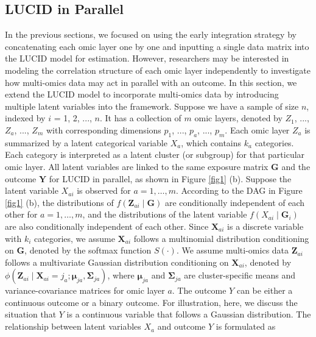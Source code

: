 \subsection{LUCID in Parallel} \label{sec_parallel}
In the previous sections, we focused on using the early integration strategy by concatenating each omic layer one by one and inputting a single data matrix into the LUCID model for estimation. However, researchers may be interested in modeling the correlation structure of each omic layer independently to investigate how multi-omics data may act in parallel with an outcome. In this section, we extend the LUCID model to incorporate multi-omics data by introducing multiple latent variables into the framework. Suppose we have a sample of size $n$, indexed by $i$ = 1, 2, ..., $n$. It has a collection of $m$ omic layers, denoted by $Z_1$, ..., $Z_a$, ..., $Z_m$ with corresponding dimensions $p_1$, ..., $p_a$, ..., $p_m$. Each omic layer $Z_a$ is summarized by a latent categorical variable $X_a$, which contains $k_a$ categories. Each category is interpreted as a latent cluster (or subgroup) for that particular omic layer. All latent variables are linked to the same exposure matrix $\bm G$ and the outcome $\bm Y$ for LUCID in parallel, as shown in Figure \ref{fig1} (b).
Suppose the latent variable $X_{a i}$ is observed for $a=1, \ldots, m$. According to the DAG in Figure \ref{fig1} (b), the distributions of $f\left(\boldsymbol{Z}_{a i} \mid \boldsymbol{G}\right)$ are conditionally independent of each other for $a=1, \ldots, m$, and the distributions of the latent variable $f\left(X_{a i} \mid \boldsymbol{G}_{i}\right)$ are also conditionally independent of each other.
Since $\boldsymbol{X}_{a i}$ is a discrete variable with $k_{i}$ categories, we assume $\boldsymbol{X}
_{a i}$ follows a multinomial distribution conditioning on $\boldsymbol{G}$, denoted by the softmax function $S(\cdot)$. We assume multi-omics data $\boldsymbol{Z}_{a i}$ follows a multivariate Gaussian distribution conditioning on $\boldsymbol{X}_{a i}$, denoted by $\phi\left(\boldsymbol{Z}_{a i} \mid \boldsymbol{X}_{a i}=j_{a} ; \boldsymbol{\mu}_{j a}, \boldsymbol{\Sigma}_{j a}\right)$, where $\boldsymbol{\mu}_{j a}$ and $\boldsymbol{\Sigma}_{j a}$ are cluster-specific means and variance-covariance matrices for omic layer $a$. The outcome $Y$ can be either a continuous outcome or a binary outcome. For illustration, here, we discuss the situation that $Y$ is a continuous variable that follows a Gaussian distribution. The relationship between latent variables $X_{a}$ and outcome $Y$ is formulated as
